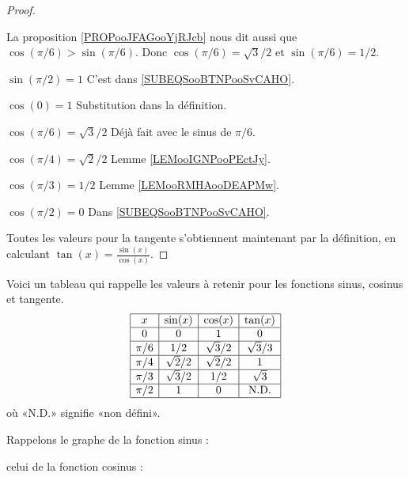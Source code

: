 \begin{proof}
\begin{subproof}
		La proposition \ref{PROPooJFAGooYjRJcb} nous dit aussi que \( \cos(\pi/6)>\sin(\pi/6)\). Donc \( \cos(\pi/6)=\sqrt{ 3 }/2\) et \( \sin(\pi/6)=1/2\).
		\item[$\sin(\pi/2)=1 $] C'est dans \eqref{SUBEQSooBTNPooSvCAHO}.
		\item[$\cos(0)=1 $] Substitution dans la définition.
		\item[$\cos(\pi/6)=\sqrt{ 3 }/2 $] Déjà fait avec le sinus de \( \pi/6\).
		\item[$\cos(\pi/4)=\sqrt{ 2 }/2 $]  Lemme \ref{LEMooIGNPooPEctJy}.
		\item[$\cos(\pi/3)=1/2 $] Lemme \ref{LEMooRMHAooDEAPMw}.
		\item[$\cos(\pi/2)=0 $] Dans \eqref{SUBEQSooBTNPooSvCAHO}.
	\end{subproof}
	Toutes les valeurs pour la tangente s'obtiennent maintenant par la définition, en calculant \( \tan(x)=\frac{ \sin(x) }{ \cos(x) }\).
\end{proof}

Voici un tableau qui rappelle les valeurs à retenir pour les fonctions sinus, cosinus et tangente.
\begin{equation}\label{PGooIMQFooTnBdIl}
	\begin{array}[]{|c|c|c|c|}
		\hline
		x     & \sin(x)    & \cos(x)    & \tan(x)     \\
		\hline
		0     & 0          & 1          & 0           \\
		\hline
		\pi/6 & 1/2        & \sqrt{3}/2 & \sqrt{3}/3  \\
		\hline
		\pi/4 & \sqrt{2}/2 & \sqrt{2}/2 & 1           \\
		\hline
		\pi/3 & \sqrt{3}/2 & 1/2        & \sqrt{3}    \\
		\hline
		\pi/2 & 1          & 0          & \text{N.D.} \\
		\hline
	\end{array}
\end{equation}
où «N.D.»  signifie «non défini».

Rappelons le graphe de la fonction sinus :
\begin{center}
	
\end{center}
celui de la fonction cosinus :
\begin{center}
	
\end{center}




